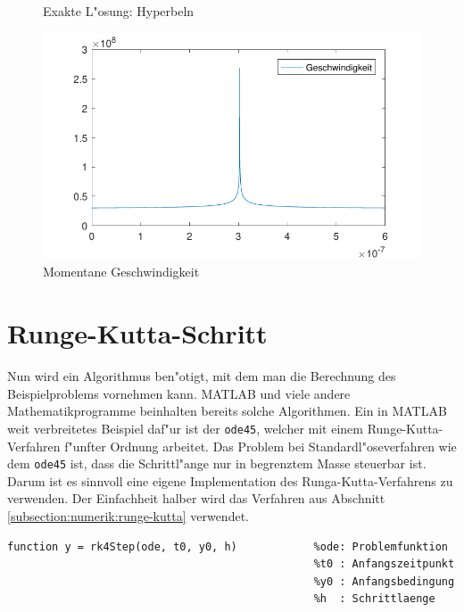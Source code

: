 \begin{refsection}
\begin{figure}
\caption{Exakte L"osung: Hyperbeln}
\label{image:hyperbelOptimal}
\end{figure}
\begin{figure}
\centering
\includegraphics{schrittlaenge/images/geschwindigkeitHyperbel.pdf}
\caption{Momentane Geschwindigkeit}
\label{image:geschwindigkeitHyperbel}
\end{figure}

\section{Runge-Kutta-Schritt\label{section:schrittlaenge:runge-kutta}}
%
Nun wird ein Algorithmus ben"otigt, mit dem man die Berechnung des Beispielproblems vornehmen kann.
MATLAB und viele andere Mathematikprogramme beinhalten bereits solche Algorithmen.
Ein in MATLAB weit verbreitetes Beispiel daf"ur ist der \texttt{ode45}, welcher mit einem Runge-Kutta-Verfahren f"unfter Ordnung arbeitet.
Das Problem bei Standardl"oseverfahren wie dem \texttt{ode45} ist, dass die Schrittl"ange nur in begrenztem Masse steuerbar ist. 
Darum ist es sinnvoll eine eigene Implementation des Runga-Kutta-Verfahrens zu verwenden. Der Einfachheit halber wird das Verfahren aus Abschnitt \ref{subsection:numerik:runge-kutta} verwendet. 
\begin{lstlisting}[style=MATLAB, caption=Runge-Kutta-Schritt, captionpos=b, label=code:rk4Step] 
function y = rk4Step(ode, t0, y0, h)            %ode: Problemfunktion
                                                %t0 : Anfangszeitpunkt  
                                                %y0 : Anfangsbedingung 
                                                %h  : Schrittlaenge
                                                

\end{lstlisting}
\end{refsection}
